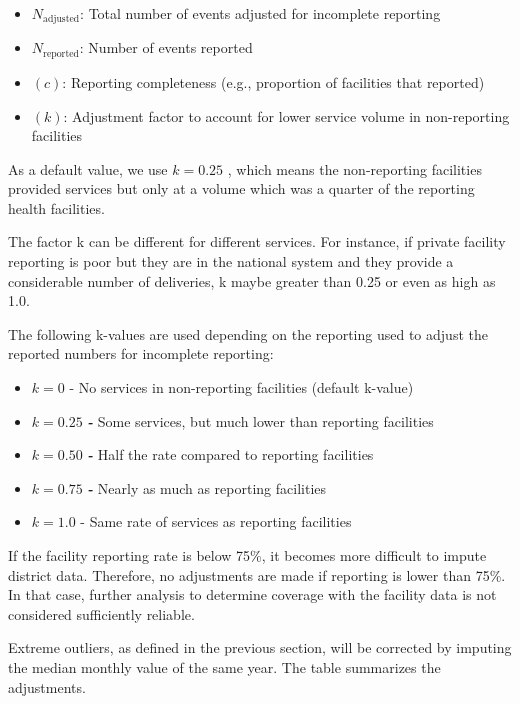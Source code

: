\documentclass[
  english,
  letterpaper,
  DIV=11,
  numbers=noendperiod]{scrreprt}
\providecommand{\tightlist}{%
  \setlength{\itemsep}{0pt}\setlength{\parskip}{0pt}}
\begin{document}
\begin{itemize}
\tightlist
\item
  \(N_{\text{adjusted}}\): Total number of events adjusted for
  incomplete reporting
\item
  \(N_{\text{reported}}\): Number of events reported
\item
  \(( c )\): Reporting completeness (e.g., proportion of facilities that
  reported)
\item
  \(( k )\): Adjustment factor to account for lower service volume in
  non-reporting facilities
\end{itemize}

As a default value, we use \(k=0.25\) , which means the non-reporting
facilities provided services but only at a volume which was a quarter of
the reporting health facilities.

The factor k can be different for different services. For instance, if
private facility reporting is poor but they are in the national system
and they provide a considerable number of deliveries, k maybe greater
than 0.25 or even as high as 1.0.

The following k-values are used depending on the reporting used to
adjust the reported numbers for incomplete reporting:

\begin{itemize}
\tightlist
\item
  \(k=0\) - No services in non-reporting facilities (default k-value)
\item
  \(k=0.25\) \textbf{\emph{-}} Some services, but much lower than
  reporting facilities
\item
  \(k=0.50\) \textbf{\emph{-}} Half the rate compared to reporting
  facilities
\item
  \(k=0.75\) \textbf{\emph{-}} Nearly as much as reporting facilities
\item
  \(k= 1.0\) - Same rate of services as reporting facilities
\end{itemize}

If the facility reporting rate is below 75\%, it becomes more difficult
to impute district data. Therefore, no adjustments are made if reporting
is lower than 75\%. In that case, further analysis to determine coverage
with the facility data is not considered sufficiently reliable.

Extreme outliers, as defined in the previous section, will be corrected
by imputing the median monthly value of the same year. The table
summarizes the adjustments.
\end{document}
